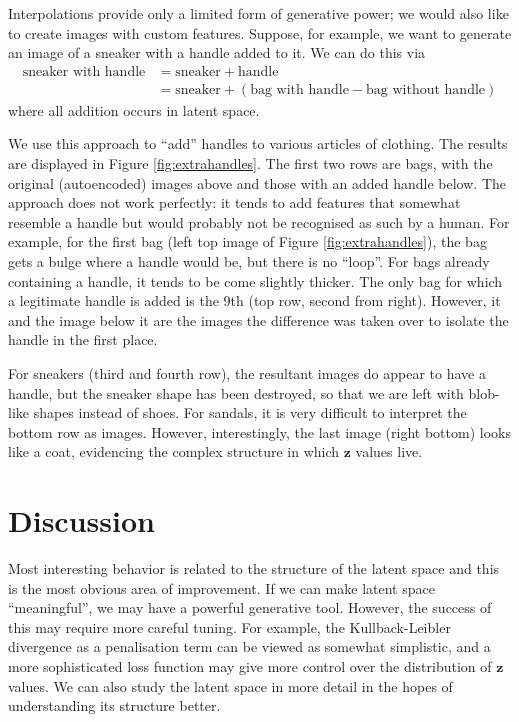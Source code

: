 \documentclass[]{article}
\begin{document}
\hspace{\parindent} Interpolations provide only a limited form of generative power; we would also like to create images with custom features. Suppose, for example, we want to generate an image of a sneaker with a handle added to it. We can do this via
\begin{align}
  \label{eq:sneaker_handle}
  \text{sneaker with handle} &= \text{sneaker} + \text{handle} \\
  &= \text{sneaker} + (\text{bag with handle} - \text{bag without handle})
\end{align}
where all addition occurs in latent space.

We use this approach to ``add'' handles to various articles of clothing. The results are displayed in Figure \ref{fig:extrahandles}. The first two rows are bags, with the original (autoencoded) images above and those with an added handle below. The approach does not work perfectly: it tends to add features that somewhat resemble a handle but would probably not be recognised as such by a human. For example, for the first bag (left top image of Figure \ref{fig:extrahandles}), the bag gets a bulge where a handle would be, but there is no ``loop''. For bags already containing a handle, it tends to be come slightly thicker. The only bag for which a legitimate handle is added is the 9th (top row, second from right). However, it and the image below it are the images the difference was taken over to isolate the handle in the first place. 

For sneakers (third and fourth row), the resultant images do appear to have a handle, but the sneaker shape has been destroyed, so that we are left with blob-like shapes instead of shoes. For sandals, it is very difficult to interpret the bottom row as images. However, interestingly, the last image (right bottom) looks like a coat, evidencing the complex structure in which $\bm{z}$ values live.




\section{Discussion}
\label{sec:discussion}

\hspace{\parindent} Most interesting behavior is related to the structure of the latent space and this is the most obvious area of improvement. If we can make latent space ``meaningful'', we may have a powerful generative tool. However, the success of this may require more careful tuning. For example, the Kullback-Leibler divergence as a penalisation term can be viewed as somewhat simplistic, and a more sophisticated loss function may give more control over the distribution of $\bm{z}$ values. We can also study the latent space in more detail in the hopes of understanding its structure better.
\end{document}
